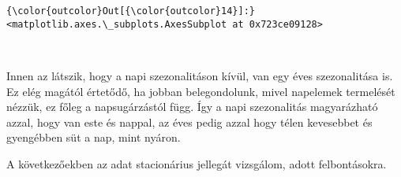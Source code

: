 \documentclass[11pt]{article}
\begin{document}
\begin{Verbatim}[commandchars=\\\{\}]
{\color{outcolor}Out[{\color{outcolor}14}]:} <matplotlib.axes.\_subplots.AxesSubplot at 0x723ce09128>
\end{Verbatim}
            
    \begin{center}
    \end{center}
    { \hspace*{\fill} \\}
    
    Innen az látszik, hogy a napi szezonalitáson kívül, van egy éves
szezonalitása is. Ez elég magától értetődő, ha jobban belegondolunk,
mivel napelemek termelését nézzük, ez főleg a napsugárzástól függ. Így a
napi szezonalitás magyarázható azzal, hogy van este és nappal, az éves
pedig azzal hogy télen kevesebbet és gyengébben süt a nap, mint nyáron.

    A következőekben az adat stacionárius jellegát vizsgálom, adott
felbontásokra.
\end{document}
